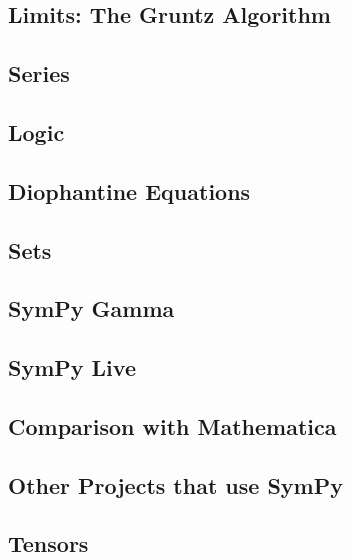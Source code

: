 \subsection{Limits: The Gruntz Algorithm}



\subsection{Series}



\subsection{Logic}



\subsection{Diophantine Equations}



\subsection{Sets}


\subsection{SymPy Gamma}\label{sympy-gamma}



\subsection{SymPy Live}\label{sympy-live}



\subsection{Comparison with Mathematica}



\subsection{Other Projects that use SymPy}




\subsection{Tensors}


